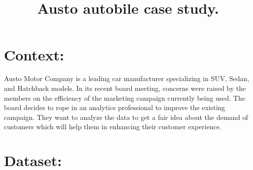 \documentclass[12pt,a4paper]{style}
\title{\Large \bf
	Austo autobile case study. %
}
\begin{document}
	\section{Context:}
	Austo Motor Company is a leading car manufacturer specializing in SUV, Sedan, and Hatchback models. In its recent board meeting, concerns were raised by the members on the efficiency of the marketing campaign currently being used. The board decides to rope in an analytics professional to improve the existing campaign. They want to analyze the data to get a fair idea about the demand of customers which will help them in enhancing their customer experience.
	
	\section{Dataset:} 
\end{document}

